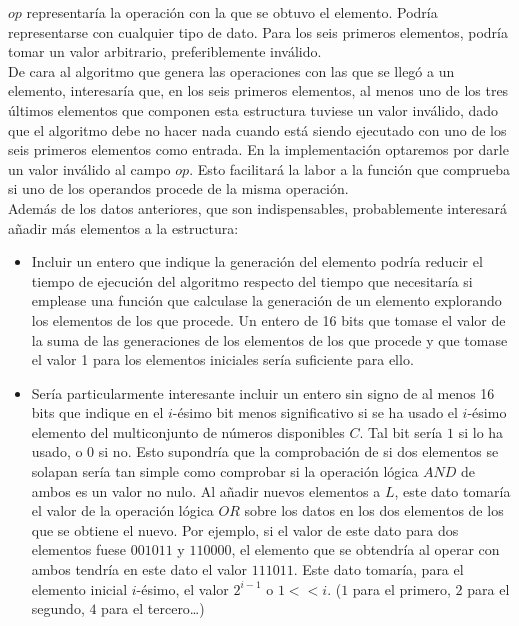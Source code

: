 $op$ representaría la operación con la que se obtuvo el elemento.
Podría representarse con cualquier tipo de dato. Para los seis primeros
elementos, podría tomar un valor arbitrario, preferiblemente inválido.\\

De cara al algoritmo que genera las operaciones con las que se llegó a un
elemento, interesaría que, en los seis primeros elementos, al menos uno de los
tres últimos elementos que componen esta estructura tuviese un valor inválido,
dado que el algoritmo debe no hacer nada cuando está siendo ejecutado con uno
de los seis primeros elementos como entrada. En la implementación optaremos
por darle un valor inválido al campo $op$. Esto facilitará la labor a la función
que comprueba si uno de los operandos procede de la misma operación. \\

Además de los datos anteriores, que son indispensables, probablemente interesará
 añadir más elementos a la estructura:

\begin{itemize}
	\item Incluir un entero que indique la generación del elemento podría reducir
	el tiempo de ejecución del algoritmo respecto del tiempo que necesitaría si
	emplease una función que calculase la generación de un elemento explorando los
	 elementos de los que procede. Un entero de 16 bits que tomase el valor de la
	  suma de las generaciones de los elementos de los que procede y que tomase el
		 valor 1 para los elementos iniciales sería suficiente para ello.
	\item Sería particularmente interesante incluir un entero sin signo de al
	menos 16 bits que indique en el $i$-ésimo bit menos significativo si se ha
	usado el $i$-ésimo elemento del multiconjunto de números disponibles $C$. Tal
	bit sería $1$ si lo ha usado, o $0$ si no. Esto supondría que la comprobación
	de si dos elementos se solapan sería tan simple como comprobar si la operación
	lógica $AND$ de ambos es un valor no nulo. Al añadir nuevos elementos a $L$,
	este dato tomaría el valor de la operación lógica $OR$ sobre los datos en los
	dos elementos de los que se obtiene el nuevo. Por ejemplo, si el valor de
	este dato para dos elementos fuese $001011$ y $110000$, el elemento que se
	obtendría al operar con ambos tendría en este dato el valor $111011$. Este
	dato tomaría, para el elemento inicial $i$-ésimo, el valor $2^{i-1}$ o
	$1 << i$. ($1$ para el primero, $2$ para el segundo, $4$ para el tercero\ldots)
\end{itemize}

